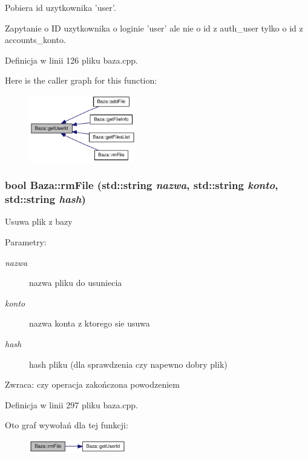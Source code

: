 Pobiera id uzytkownika 'user'. 

Zapytanie o ID uzytkownika o loginie 'user' ale nie o id z auth\_\-user tylko o id z accounts\_\-konto. 

Definicja w linii 126 pliku baza.cpp.

Here is the caller graph for this function:\nopagebreak
\begin{figure}[H]
\begin{center}
\leavevmode
\includegraphics[width=132pt]{d8/d84/a00001_65054f08c8fd7c600f6c2fe2c7f61a43_icgraph}
\end{center}
\end{figure}
\hypertarget{a00001_7161c573401166cc5f7d98ae6f335b44}{
\subsubsection[{rmFile}]{\setlength{\rightskip}{0pt plus 5cm}bool Baza::rmFile (std::string {\em nazwa}, \/  std::string {\em konto}, \/  std::string {\em hash})}}
\label{d8/d84/a00001_7161c573401166cc5f7d98ae6f335b44}


Usuwa plik z bazy \begin{Desc}
\item[Parametry:]
\begin{description}
\item[{\em nazwa}]nazwa pliku do usuniecia \item[{\em konto}]nazwa konta z ktorego sie usuwa \item[{\em hash}]hash pliku (dla sprawdzenia czy napewno dobry plik) \end{description}
\end{Desc}
\begin{Desc}
\item[Zwraca:]czy operacja zakończona powodzeniem \end{Desc}


Definicja w linii 297 pliku baza.cpp.

Oto graf wywołań dla tej funkcji:\nopagebreak
\begin{figure}[H]
\begin{center}
\leavevmode
\includegraphics[width=120pt]{d8/d84/a00001_7161c573401166cc5f7d98ae6f335b44_cgraph}
\end{center}
\end{figure}


